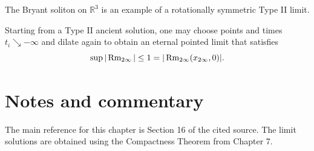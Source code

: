 \begin{example}
\label{ch08-ex-bryant-soliton}
The Bryant soliton on \(\mathbb R^3\) is an example of a rotationally symmetric Type II limit.
\end{example}

\begin{remark}
\label{ch08-rem-third-dilation}
Starting from a Type II ancient solution, one may choose points and times \(t_i\searrow -\infty\) and dilate again to obtain an eternal pointed limit that satisfies
\[
\sup |\operatorname{Rm}_{2\infty}|\le 1 = |\operatorname{Rm}_{2\infty}(x_{2\infty},0)|.
\]
\end{remark}

\section*{Notes and commentary}

\begin{remark}
\label{ch08-rem-notes-reference}
The main reference for this chapter is Section 16 of the cited source. The limit solutions are obtained using the Compactness Theorem from Chapter 7.
\end{remark}
